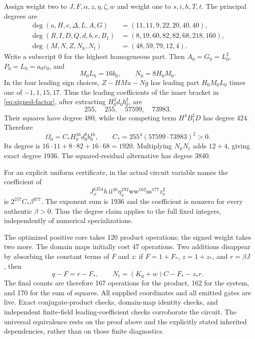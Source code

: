 Assign weight two to $J,F,\alpha,z,\eta,\zeta,w$ and weight one to
$s,i,h,T,t$. The principal degrees are
\begin{align*}
 \deg(a,H,c,\Delta,L,A,G)&=(11,11,9,22,20,40,40),\\
 \deg(R,I,D,Q,d,b,e,B_1)&=(8,19,60,82,82,68,218,160),\\
 \deg(M,N,Z,N_k,N_t)&=(48,59,79,12,4).
\end{align*}
Write a subscript $0$ for the highest homogeneous part. Then
$A_0=G_0=L_0^2$, $P_0=L_0=a_0c_0$, and
\[
 M_0L_0=16b_0,\qquad N_0=8H_0M_0.
\]
In the four leading sign choices, $Z-HMu-Ng$ has leading part
$H_0M_0L_0$ times one of $-1,1,15,17$. Thus the leading coefficients
of the inner bracket in \eqref{eq:signed-factor}, after extracting
$H_0^2d_0b_0^2$, are
\[
 255,\quad255,\quad57599,\quad73983.
\]
Their squares have degree 480, while the competing term $H^4B_1^2D$
has degree 424. Therefore
\begin{equation}\label{eq:integer-top-form}
 \Omega_0=C_*H_0^{16}d_0^8b_0^{16},\qquad
 C_*=255^4(57599\cdot73983)^2>0.
\end{equation}
Its degree is $16\cdot11+8\cdot82+16\cdot68=1920$.
Multiplying $N_kN_t$ adds $12+4$, giving exact degree 1936.
The squared-residual alternative has degree 3840.

For an explicit uniform certificate, in the actual circuit variable
names the coefficient of
\[
 J_x^{1354}h\,\mathrm{ii}^{48}\eta_x^{192}
 \mathrm{ww}^{162}\mathrm{ss}^{177}z_x^2
\]
is $2^{257}C_*\beta^{677}$. The exponent sum is 1936 and the
coefficient is nonzero for every authentic $\beta>0$. Thus the degree
claim applies to the full fixed integers, independently of numerical
specializations.

The optimized positive core takes 120 product operations; the signed
weight takes two more. The domain maps initially cost 47 operations.
Two additions disappear by absorbing the constant terms of $F$ and $z$:
if $F=1+F_*$, $z=1+z_*$, and $r=\beta J$, then
\[
 q-F=r-F_*,\qquad N_t=(K_0+w)C-F_*-z_*r.
\]
The final counts are therefore 167 operations for the product, 162 for
the system, and 170 for the sum of squares. All supplied coordinates and
all emitted gates are live. Exact conjugate-product checks, domain-map
identity checks, and independent finite-field leading-coefficient checks
corroborate the circuit. The universal equivalence rests on the proof
above and the explicitly stated inherited dependencies, rather than on
those finite diagnostics.
